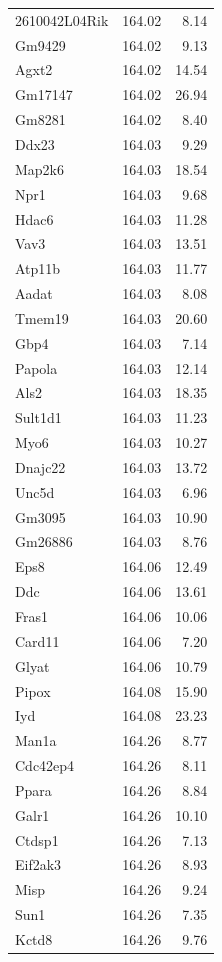 \documentclass{article}
\begin{document}
\begin{longtable}{lrr}
  2610042L04Rik & 164.02 & 8.14 \\ 
  Gm9429 & 164.02 & 9.13 \\ 
  Agxt2 & 164.02 & 14.54 \\ 
  Gm17147 & 164.02 & 26.94 \\ 
  Gm8281 & 164.02 & 8.40 \\ 
  Ddx23 & 164.03 & 9.29 \\ 
  Map2k6 & 164.03 & 18.54 \\ 
  Npr1 & 164.03 & 9.68 \\ 
  Hdac6 & 164.03 & 11.28 \\ 
  Vav3 & 164.03 & 13.51 \\ 
  Atp11b & 164.03 & 11.77 \\ 
  Aadat & 164.03 & 8.08 \\ 
  Tmem19 & 164.03 & 20.60 \\ 
  Gbp4 & 164.03 & 7.14 \\ 
  Papola & 164.03 & 12.14 \\ 
  Als2 & 164.03 & 18.35 \\ 
  Sult1d1 & 164.03 & 11.23 \\ 
  Myo6 & 164.03 & 10.27 \\ 
  Dnajc22 & 164.03 & 13.72 \\ 
  Unc5d & 164.03 & 6.96 \\ 
  Gm3095 & 164.03 & 10.90 \\ 
  Gm26886 & 164.03 & 8.76 \\ 
  Eps8 & 164.06 & 12.49 \\ 
  Ddc & 164.06 & 13.61 \\ 
  Fras1 & 164.06 & 10.06 \\ 
  Card11 & 164.06 & 7.20 \\ 
  Glyat & 164.06 & 10.79 \\ 
  Pipox & 164.08 & 15.90 \\ 
  Iyd & 164.08 & 23.23 \\ 
  Man1a & 164.26 & 8.77 \\ 
  Cdc42ep4 & 164.26 & 8.11 \\ 
  Ppara & 164.26 & 8.84 \\ 
  Galr1 & 164.26 & 10.10 \\ 
  Ctdsp1 & 164.26 & 7.13 \\ 
  Eif2ak3 & 164.26 & 8.93 \\ 
  Misp & 164.26 & 9.24 \\ 
  Sun1 & 164.26 & 7.35 \\ 
  Kctd8 & 164.26 & 9.76 \\ 

\end{longtable}
\end{document}
